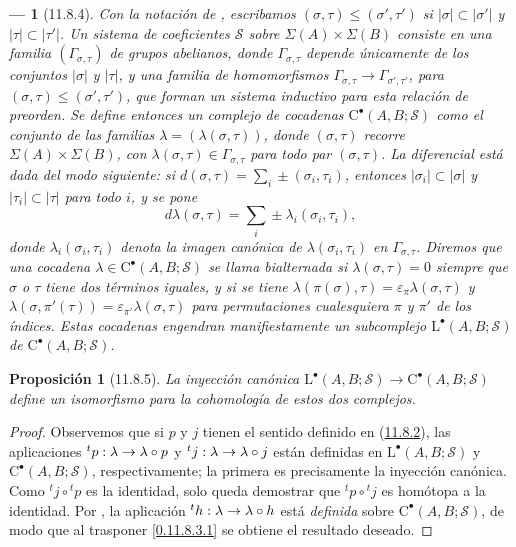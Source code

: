 \documentclass[10pt,oneside,openany]{book}
\theoremstyle{egaenv}\newtheorem*{env}{---}
\theoremstyle{egastatement}
\newtheorem*{proposition}{Proposición}
\theoremstyle{egadescription}
\renewcommand{\leq}{\leqslant}
\renewcommand{\to}{\mathchoice{\longrightarrow}{\rightarrow}{\rightarrow}{\rightarrow}}
\begin{document}
\begin{env}[11.8.4]
\label{0.11.8.4}
\label{0.11.8.4-fr}
Con la notación de , escribamos
$(\sigma,\tau)\leq(\sigma',\tau')$
si $|\sigma|\subset|\sigma'|$ y $|\tau|\subset|\tau'|$.
Un \emph{sistema de coeficientes} $\mathscr S$ sobre
$\Sigma(A)\times\Sigma(B)$ consiste en una familia
$(\Gamma_{\sigma,\tau})$ de grupos abelianos, donde
$\Gamma_{\sigma,\tau}$ depende únicamente de los conjuntos $|\sigma|$ y
$|\tau|$, y una familia de homomorfismos $\Gamma_{\sigma,\tau}\longrightarrow\Gamma_{\sigma',\tau'}$, para $(\sigma,\tau)\leq(\sigma',\tau')$, que forman un \emph{sistema inductivo} para esta relación de preorden. Se define entonces un \emph{complejo de cocadenas} $\mathrm C^\bullet(A,B;\mathscr S)$ como el conjunto de las familias $\lambda=(\lambda(\sigma,\tau))$, donde $(\sigma,\tau)$ recorre $\Sigma(A)\times\Sigma(B)$, con $\lambda(\sigma,\tau)\in\Gamma_{\sigma,\tau}$ para todo par $(\sigma,\tau)$. La diferencial está dada del modo siguiente: si
$d(\sigma,\tau)=\sum_i\pm(\sigma_i,\tau_i)$,
entonces $|\sigma_i|\subset|\sigma|$ y $|\tau_i|\subset|\tau|$ para todo
$i$, y se pone
\[
d\lambda(\sigma,\tau)=\sum_i\pm\lambda_i(\sigma_i,\tau_i),
\]
donde $\lambda_i(\sigma_i,\tau_i)$ denota la imagen canónica de
$\lambda(\sigma_i,\tau_i)$ en $\Gamma_{\sigma,\tau}$. Diremos que una cocadena $\lambda\in\mathrm C^\bullet(A,B;\mathscr S)$ se llama
\emph{bialternada} si $\lambda(\sigma,\tau)=0$ siempre que $\sigma$
o $\tau$ tiene dos términos iguales, y si se tiene $\lambda(\pi(\sigma),\tau)=\varepsilon_\pi\lambda(\sigma,\tau)$ y $\lambda(\sigma,\pi'(\tau))=\varepsilon_{\pi'}\lambda(\sigma,\tau)$ para permutaciones cualesquiera $\pi$ y $\pi'$ de los índices.
Estas cocadenas engendran manifiestamente un \emph{subcomplejo}
$\mathrm L^\bullet(A,B;\mathscr S)$ de
$\mathrm C^\bullet(A,B;\mathscr S)$.
\end{env}

\begin{proposition}[11.8.5]
\label{0.11.8.5-fr}
{La inyección canónica
$\mathrm L^\bullet(A,B;\mathscr S)\longrightarrow\mathrm C^\bullet(A,B;\mathscr S)$
define un isomorfismo para la cohomología de estos dos complejos.}
\end{proposition}

\begin{proof}
Observemos que si $p$ y $j$ tienen el sentido definido en (\hyperref[0.11.8.2-fr]{11.8.2}), las aplicaciones ${}^tp:\lambda\to\lambda\circ p$ y ${}^tj:\lambda\to\lambda\circ j$ están definidas en $\mathrm L^\bullet(A,B;\mathscr S)$ y
$\mathrm C^\bullet(A,B;\mathscr S)$, respectivamente; la primera es precisamente
la inyección canónica.
Como ${}^tj\circ{}^tp$ es la identidad, solo queda demostrar
que ${}^tp\circ{}^tj$ es homótopa a la identidad.
Por , la aplicación
${}^th:\lambda\to\lambda\circ h$
está \emph{definida} sobre $\mathrm C^\bullet(A,B;\mathscr S)$, de modo que al trasponer
\eqref{0.11.8.3.1} se obtiene el resultado deseado.
\end{proof}
\end{document}
